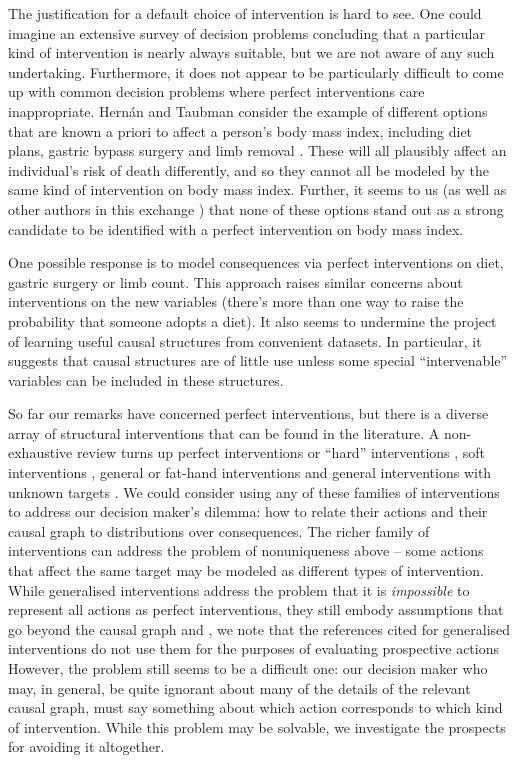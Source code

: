\documentclass{article}
\begin{document}
The justification for a default choice of intervention is hard to see. One could imagine an extensive survey of decision problems concluding that a particular kind of intervention is nearly always suitable, but we are not aware of any such undertaking. Furthermore, it does not appear to be particularly difficult to come up with common decision problems where perfect interventions care inappropriate. Hernán and Taubman consider the example of different options that are known a priori to affect a person's body mass index, including diet plans, gastric bypass surgery and limb removal \citep{hernan_does_2008,noauthor_does_2016}. These will all plausibly affect an individual's risk of death differently, and so they cannot all be modeled by the same kind of intervention on body mass index. Further, it seems to us (as well as other authors in this exchange \citep{pearl_does_2018,hernanInvitedCommentaryCausal2009,shahar_association_2009}) that none of these options stand out as a strong candidate to be identified with a perfect intervention on body mass index.

One possible response is to model consequences via perfect interventions on diet, gastric surgery or limb count. This approach raises similar concerns about interventions on the new variables (there's more than one way to raise the probability that someone adopts a diet). It also seems to undermine the project of learning useful causal structures from convenient datasets. In particular, it suggests that causal structures are of little use unless some special ``intervenable'' variables can be included in these structures.

So far our remarks have concerned perfect interventions, but there is a diverse array of structural interventions that can be found in the literature. A non-exhaustive review turns up perfect interventions or ``hard'' interventions \citep[ch. ~1]{pearl_causality:_2009,hauser_characterization_2012}, soft interventions \citep{correa_calculus_2020,eberhardt_interventions_2007}, general or fat-hand interventions \citep{eberhardt_interventions_2007,yang_characterizing_2018,glymour_evaluating_2017} and general interventions with unknown targets \citep{brouillard_differentiable_2020}. We could consider using any of these families of interventions to address our decision maker's dilemma: how to relate their actions and their causal graph to distributions over consequences. The richer family of interventions can address the problem of nonuniqueness above -- some actions that affect the same target may be modeled as different types of intervention. While generalised interventions address the problem that it is \emph{impossible} to represent all actions as perfect interventions, they still embody assumptions that go beyond the causal graph and , we note that the references cited for generalised interventions do not use them for the purposes of evaluating prospective actions However, the problem still seems to be a difficult one: our decision maker who may, in general, be quite ignorant about many of the details of the relevant causal graph, must say something about which action corresponds to which kind of intervention. While this problem may be solvable, we investigate the prospects for avoiding it altogether.
\end{document}
